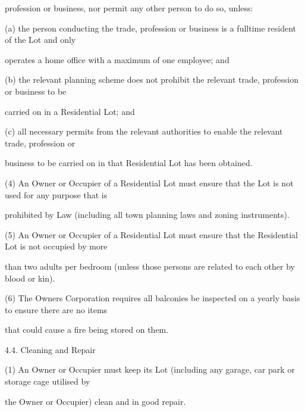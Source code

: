\documentclass{article}
\begin{document}
{\fontsize{10.02}{1}profession or business, nor permit any other person to do so, unless: }

{\fontsize{9.962}{1}(a) the person conducting the trade, profession or business is a fulltime resident of the Lot and only }

\newpage


















{\fontsize{10.02}{1}operates a home office with a maximum of one employee; and }

{\fontsize{9.962}{1}(b) the relevant planning scheme does not prohibit the relevant trade, profession or business to be }

{\fontsize{10.02}{1}carried on in a Residential Lot; and }

{\fontsize{9.962}{1}(c) all necessary permits from the relevant authorities to enable the relevant trade, profession or }

{\fontsize{10.02}{1}business to be carried on in that Residential Lot has been obtained. }

{\fontsize{9.962}{1}(4) An Owner or Occupier of a Residential Lot must ensure that the Lot is not used for any purpose that is }

{\fontsize{10.02}{1}prohibited by Law (including all town planning laws and zoning instruments). }

{\fontsize{9.962}{1}(5) An Owner or Occupier of a Residential Lot must ensure that the Residential Lot is not occupied by more }

{\fontsize{10.02}{1}than two adults per bedroom (unless those persons are related to each other by blood or kin). }

{\fontsize{9.962}{1}(6) The Owners Corporation requires all balconies be inspected on a yearly basis to ensure there are no items }

{\fontsize{10.02}{1}that could cause a fire being stored on them. }

{\fontsize{9.99}{1}4.4. Cleaning and Repair }

{\fontsize{9.962}{1}(1) An Owner or Occupier must keep its Lot (including any garage, car park or storage cage utilised by }

{\fontsize{10.02}{1}the Owner or Occupier) clean and in good repair. }
\end{document}
